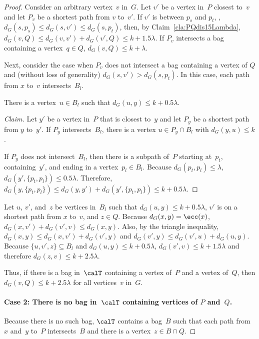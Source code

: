 \begin{proof}
Consider an arbitrary vertex~$v$ in~$G$.
Let $v'$ be a vertex in~$P$ closest to~$v$ and let $P_v$ be a shortest path from $v$ to~$v'$.
If $v'$ is between $p_s$ and $p_t$, \ie, $d_G(s, p_s) \leq d_G(s, v') \leq d_G(s, p_t)$, then, by Claim~\ref{cla:PQdis15Lambda}, $d_G(v, Q) \leq d_G(v, v') + d_G(v', Q) \leq k + 1.5 \lambda$.
If $P_v$ intersects a bag containing a vertex~$q \in Q$, $d_G(v, Q) \leq k + \lambda$.

Next, consider the case when $P_v$ does not intersect a bag containing a vertex of $Q$ and (without loss of generality) $d_G(s, v') > d_G(s, p_t)$.
In this case, each path from $x$ to~$v$ intersects~$B_l$.

\begin{claim}
There is a vertex~\( u \in B_l \) such that \( d_G(u, y) \leq k + 0.5 \lambda \).
\end{claim}

\begin{proof}
    [Claim]
Let $y'$ be a vertex in~$P$ that is closest to~$y$ and let $P_y$ be a shortest path from $y$ to~$y'$.
If $P_y$ intersects~$B_l$, there is a vertex $u \in P_y \cap B_l$ with $d_G(y, u) \leq k$.

If $P_y$ does not intersect~$B_l$, then there is a subpath of~$P$ starting at~$p_t$, containing~$y'$, and ending in a vertex~$p_l \in B_l$.
Because $d_G(p_t, p_l) \leq \lambda$, $d_G(y', \{ p_t, p_l \}) \leq 0.5 \lambda$.
Therefore, $d_G(y, \{ p_t, p_l \}) \leq d_G(y, y') + d_G(y', \{ p_t, p_l \}) \leq k + 0.5 \lambda$.
\end{proof}

Let $u$, $v'$, and~$z$ be vertices in~$B_l$ such that $d_G(u, y) \leq k + 0.5 \lambda$, $v'$ is on a shortest path from $x$ to~$v$, and $z \in Q$.
Because $d_G(x, y) = \ecc(x)$, $d_G(x, v') + d_G(v', v) \leq d_G(x, y)$.
Also, by the triangle inequality, $d_G(x, y) \leq d_G(x, v') + d_G(v', y)$ and $d_G(v', y) \leq d_G(v', u) + d_G(u, y)$.
Because $\{ u, v', z \} \subseteq B_l$ and $d_G(u, y) \leq k + 0.5 \lambda$, $d_G(v', v) \leq k + 1.5 \lambda$ and therefore $d_G(z, v) \leq k + 2.5 \lambda$.

Thus, if there is a bag in~$\calT$ containing a vertex of~$P$ and a vertex of~$Q$, then $d_G(v, Q) \leq k + 2.5 \lambda$ for all vertices~$v$ in~$G$.

\paragraph{Case 2: There is no bag in~$\calT$ containing vertices of $P$ and~$Q$.}
Because there is no such bag, $\calT$ contains a bag~$B$ such that each path from $x$ and~$y$ to~$P$ intersects~$B$ and there is a vertex~$z \in B \cap Q$.


\end{proof}
